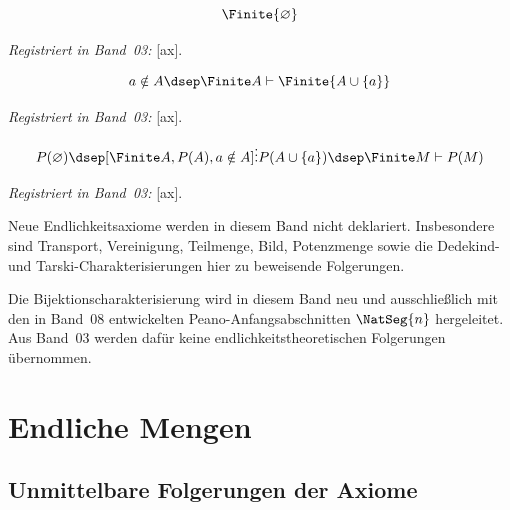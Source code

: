 \documentclass[main.tex]{subfiles}
\begin{document}
\begin{samepage}
  \begin{formulaAx}
    \[
      \Finite{\varnothing}
    \]
  \end{formulaAx}
  \par\noindent\emph{Registriert in Band~03:}
  [ax].\par
\end{samepage}

\begin{samepage}
  \begin{formulaAx}
    \[
      a\notin A\dsep \Finite A\vdash \Finite{A\cup\{a\}}
    \]
  \end{formulaAx}
  \par\noindent\emph{Registriert in Band~03:}
  [ax].\par
\end{samepage}

\begin{samepage}
  \begin{formulaAx}
    \[
      P(\varnothing)\dsep
      [\Finite A,P(A),a\notin A]\vdots P(A\cup\{a\})\dsep
      \Finite M\vdash P(M)
    \]
  \end{formulaAx}
  \par\noindent\emph{Registriert in Band~03:}
  [ax].\par
\end{samepage}

Neue Endlichkeitsaxiome werden in diesem Band nicht deklariert. Insbesondere
sind Transport, Vereinigung, Teilmenge, Bild, Potenzmenge sowie die
Dedekind- und Tarski-Charakterisierungen hier zu beweisende Folgerungen.

Die Bijektionscharakterisierung wird in diesem Band neu und ausschließlich mit
den in Band~08 entwickelten Peano-Anfangsabschnitten \(\NatSeg{n}\)
hergeleitet. Aus Band~03 werden dafür keine endlichkeitstheoretischen
Folgerungen übernommen.
\chapter{Endliche Mengen}

\section{Unmittelbare Folgerungen der Axiome}
\end{document}
